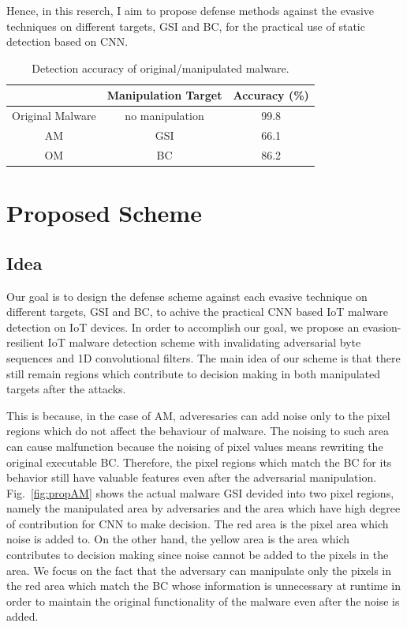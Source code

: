 \documentclass{ieeeaccess}
\newcommand{\myfigurename}{Fig.}
\begin{document}
Hence, in this reserch, I aim to propose defense methods against the evasive techniques on different targets, GSI and BC, for the practical use of static detection based on CNN.

\begin{table}[h]
  \begin{center}
    \caption{Detection accuracy of original/manipulated malware.}
    \label{tab:prev} 
    \begin{tabular}{|c|c|c|} \hline
       & Manipulation Target & Accuracy (\%) \\ \hline \hline
      Original Malware & no manipulation  & 99.8  \\ \hline
      AM & GSI & 66.1  \\ \hline 
      OM & BC & 86.2 \\ \hline
    \end{tabular}
  \end{center}
\end{table} 

\section{Proposed Scheme} \label{sec:proposed_scheme}
\subsection{Idea}
Our goal is to design the defense scheme against each evasive technique on different targets, GSI and BC, to achive the practical CNN based IoT malware detection on IoT devices.
In order to accomplish our goal, we propose an evasion-resilient IoT malware detection scheme with invalidating adversarial byte sequences and 1D convolutional filters.
The main idea of our scheme is that there still remain regions which contribute to decision making in both manipulated targets after the attacks.

This is because, in the case of AM, adveresaries can add noise only to the pixel regions which do not affect the behaviour of malware.
The noising to such area can cause malfunction because the noising of pixel values means rewriting the original executable BC.
Therefore, the pixel regions which match the BC for its behavior still have valuable features even after the adversarial manipulation.
\myfigurename~\ref{fig:propAM} shows the actual malware GSI devided into two pixel regions, namely the manipulated area by adversaries and the area which have high degree of contribution for CNN to make decision.
The red area is the pixel area which noise is added to.
On the other hand, the yellow area is the area which contributes to decision making since noise cannot be added to the pixels in the area.
We focus on the fact that the adversary can manipulate only the pixels in the red area which match the BC whose information is unnecessary at runtime in order to maintain the original functionality of the malware even after the noise is added.
\end{document}
